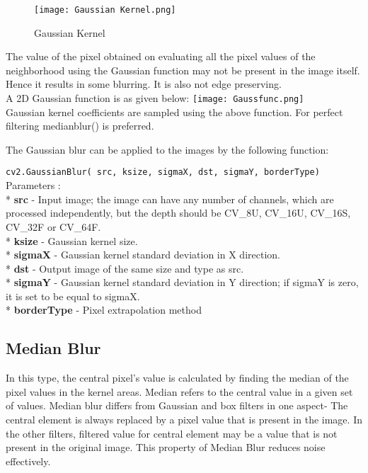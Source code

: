 \documentclass[]{article}
\begin{document}
\begin{figure}[htbp]
	\centering
    \texttt{[image: Gaussian Kernel.png]}
    \caption{Gaussian Kernel}
\end{figure}

The value of the pixel obtained on evaluating all the pixel values of
the neighborhood using the Gaussian function may not be present in the
image itself. Hence it results in some blurring. It is also not edge
preserving.\\
A 2D Gaussian function is as given below:
\centering
\texttt{[image: Gaussfunc.png]}\\
Gaussian kernel coefficients are sampled using the above function. For
perfect filtering medianblur() is preferred.

The Gaussian blur can be applied to the images by the following
function:

\texttt{cv2.GaussianBlur(\ src,\ ksize,\ sigmaX,\ dst,\ sigmaY,\ borderType)}\\

\large Parameters : \\
* \textbf{src} - Input image; the image can have any number of channels,
which are processed independently, but the depth should be CV\_8U,
CV\_16U, CV\_16S, CV\_32F or CV\_64F.\\
* \textbf{ksize} - Gaussian kernel size.\\
* \textbf{sigmaX} - Gaussian kernel standard deviation in X direction.\\
* \textbf{dst} - Output image of the same size and type as src.\\
* \textbf{sigmaY} - Gaussian kernel standard deviation in Y direction;
if sigmaY is zero, it is set to be equal to sigmaX.\\
* \textbf{borderType} - Pixel extrapolation method

\subsection{Median Blur}\label{median-blur}

In this type, the central pixel's value is calculated by finding the
median of the pixel values in the kernel areas. Median refers to the
central value in a given set of values. Median blur differs from
Gaussian and box filters in one aspect- The central element is always
replaced by a pixel value that is present in the image. In the other
filters, filtered value for central element may be a value that is not
present in the original image. This property of Median Blur reduces
noise effectively.
\end{document}
